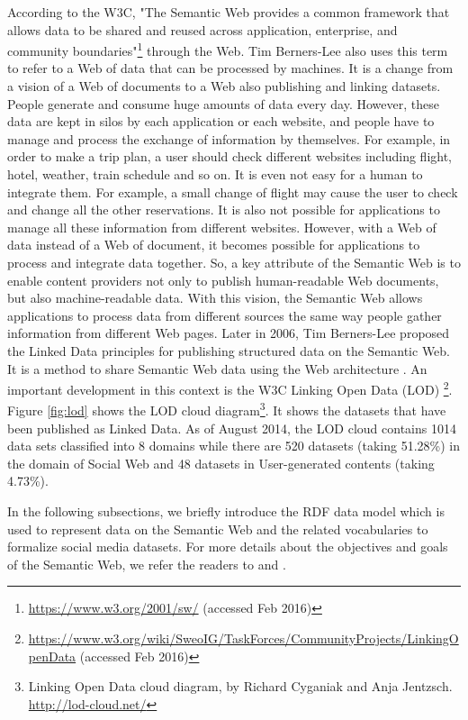 According to the W3C, "The Semantic Web provides a common framework that allows data to be shared and reused across application, enterprise, and community boundaries"\footnote{\url{https://www.w3.org/2001/sw/} (accessed Feb 2016)} through the Web. Tim Berners-Lee \cite{berners2001semantic} also uses this term to refer to a Web of data that can be processed by machines. It is a change from a vision of a Web of documents to a Web also publishing and linking datasets. People generate and consume huge amounts of data every day. However, these data are kept in silos by each application or each website, and people have to manage and process the exchange of information by themselves. For example, in order to make a trip plan, a user should check different websites including flight, hotel, weather, train schedule and so on. It is even not easy for a human to integrate them. For example, a small change of flight may cause the user to check and change all the other reservations. It is also not possible for applications to manage all these information from different websites. However, with a Web of data instead of a Web of document, it becomes possible for applications to process and integrate data together. So, a key attribute of the Semantic Web is to enable content providers not only to publish human-readable Web documents, but also machine-readable data. With this vision, the Semantic Web allows applications to process data from different sources the same way people gather information from different Web pages. 
Later in 2006, Tim Berners-Lee\cite{berners2006linked} proposed the Linked Data principles for publishing structured data on the Semantic Web. It is a method to share Semantic Web data using the Web architecture \cite{bizer2011evolving}. An important development in this context is the W3C Linking Open Data (LOD) \footnote{\url{https://www.w3.org/wiki/SweoIG/TaskForces/CommunityProjects/LinkingOpenData} (accessed Feb 2016)}. Figure \ref{fig:lod} shows the LOD cloud diagram\footnote{Linking Open Data cloud diagram, by Richard Cyganiak and Anja Jentzsch. \url{http://lod-cloud.net/}}. It shows the datasets that have been published as Linked Data. As of August 2014, the LOD cloud contains 1014 data sets classified into 8 domains while there are 520 datasets (taking 51.28\%) in the domain of Social Web and 48 datasets in User-generated contents (taking 4.73\%).


In the following subsections, we briefly introduce the RDF data model which is used to represent data on the Semantic Web and the related vocabularies to formalize social media datasets. For more details about the objectives and goals of the Semantic Web, we refer the readers to \cite{feigenbaum2007semantic} and \cite{berners2001semantic}.

